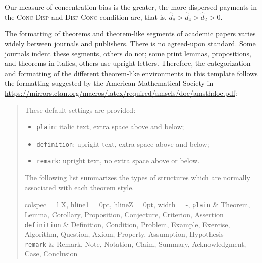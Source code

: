 \begin{result}
	\label{result:dertwinkel-kalt-2}
	Our measure of concentration bias is the greater, the more dispersed payments in the \textsc{Conc-Disp} and \textsc{Disp-Conc} condition are, that is, ${\hat{d}_8 > \hat{d}_4 > \hat{d}_2 > 0}$.
\end{result}

\begin{remark}
	\label{remark:formatting}
	The formatting of theorems and theorem-like segments of academic papers varies widely between journals and publishers. There is no agreed-upon standard. Some journals indent these segments, others do not; some print lemmas, propositions, and theorems in italics, others use upright letters. Therefore, the categorization and formatting of the different theorem-like environments in this template follows the formatting suggested by the American Mathematical Society in \url{https://mirrors.ctan.org/macros/latex/required/amscls/doc/amsthdoc.pdf}: \par
	\begin{quotation}
		These default settings are provided: \par\vskip7.5pt
		\begin{itemize}[leftmargin = \baselinedist, labelsep = 0.45\baselinedist]
			\item \texttt{plain}: italic text, extra space above and below;
			\item \texttt{definition}: upright text, extra space above and below;
			\item \texttt{remark}: upright text, no extra space above or below.
		\end{itemize} \par\vskip7.5pt
		\textellipsis \par
		The following list summarizes the types of structures which are normally
		associated with each theorem style. \par\vskip7.5pt
		\begin{tblr}{
			colspec = {l X},
			hline{1} = {0pt},
			hline{Z} = {0pt},
			width = \linewidth-\parindent,
		}
			\texttt{plain} &
			Theorem, Lemma, Corollary, Proposition, Conjecture, Criterion, Assertion
			\\
			\texttt{definition} &
			Definition, Condition, Problem, Example, Exercise, Algorithm, Question, Axiom, Property, Assumption, Hypothesis
			\\
			\texttt{remark} &
			Remark, Note, Notation, Claim, Summary, Acknowledgment, Case, Conclusion
		\end{tblr}
	\end{quotation}
\end{remark}

